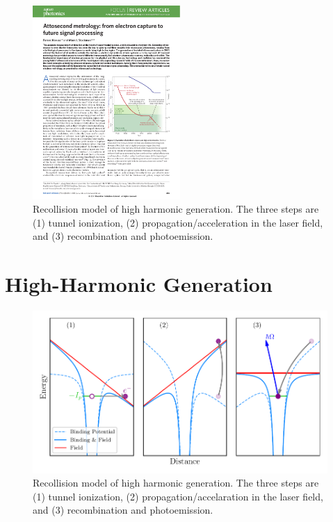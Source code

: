 \begin{figure}
	\centering
	\includegraphics[width=0.5\textwidth]{figures/Introduction/Pulse_duration.pdf}
	\caption[Recollision model of high harmonic generation]{Recollision model of high harmonic generation.  The three steps are (1) tunnel ionization, (2) propagation/acceleration in the laser field, and (3) recombination and photoemission.}
	\label{fig:Pulse_duration}
\end{figure}

\section{High-Harmonic Generation}
\label{intro_HHG}

\begin{figure}
	\centering
	\includegraphics[width=1.0\textwidth]{figures/Introduction/3-step.pdf}
	\caption[Recollision model of high harmonic generation]{Recollision model of high harmonic generation.  The three steps are (1) tunnel ionization, (2) propagation/accelaration in the laser field, and (3) recombination and photoemission.}
	\label{fig:3-step}
\end{figure}

